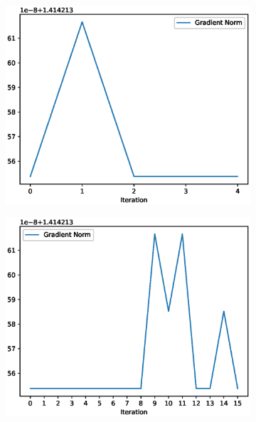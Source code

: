 \begin{figure}[h!]
\centering
\begin{subfigure}[t]{0.4\textwidth}
\centering
    \includegraphics[width=\textwidth]{images/python/pe-pD.eps}
\caption{}
\end{subfigure}
\hfill 
\begin{subfigure}[t]{0.4\textwidth}
\centering
    \includegraphics[width=\textwidth]{images/python/al-pD-ag.eps}
    \caption{}
\end{subfigure}
\hfill
\begin{subfigure}[t]{0.4\textwidth}

\end{subfigure}
\end{figure}
